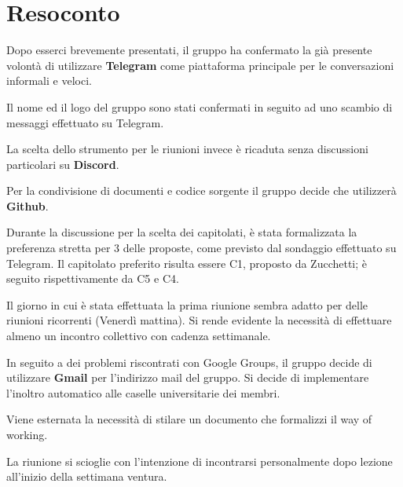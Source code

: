 \documentclass[12pt]{article}
\begin{document}
\vspace{5mm}

\section{Resoconto}
Dopo esserci brevemente presentati, il gruppo ha confermato la già presente volontà di utilizzare \textbf{Telegram} come piattaforma principale per le conversazioni informali e veloci.

Il nome ed il logo del gruppo sono stati confermati in seguito ad uno scambio di messaggi effettuato su Telegram.

La scelta dello strumento per le riunioni invece è ricaduta senza discussioni particolari su \textbf{Discord}.

Per la condivisione di documenti e codice sorgente il gruppo decide che utilizzerà \textbf{Github}.

Durante la discussione per la scelta dei capitolati, è stata formalizzata la preferenza stretta per 3 delle proposte, come previsto dal sondaggio effettuato su Telegram. Il capitolato preferito risulta essere C1, proposto da Zucchetti; è seguito rispettivamente da C5 e C4.

Il giorno in cui è stata effettuata la prima riunione sembra adatto per delle riunioni ricorrenti (Venerdì mattina). Si rende evidente la necessità di effettuare almeno un incontro collettivo con cadenza settimanale.

In seguito a dei problemi riscontrati con Google Groups, il gruppo decide di utilizzare \textbf{Gmail} per l'indirizzo mail del gruppo. Si decide di implementare l'inoltro automatico alle caselle universitarie dei membri.

Viene esternata la necessità di stilare un documento che formalizzi il way of working.

La riunione si scioglie con l'intenzione di incontrarsi personalmente dopo lezione all'inizio della settimana ventura.

\vspace{5mm}
\end{document}

